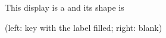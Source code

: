 This display is a  \quad and its shape is 
\par\medskip
(left: key with the label filled; right: blank)
